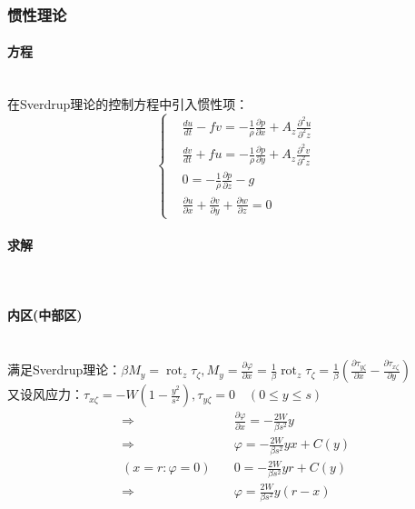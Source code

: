 \documentclass[a4paper,12pt]{article}
\begin{document}
    \subsubsection{惯性理论}
    \paragraph{方程}~{}\\
    在Sverdrup理论的控制方程中引入惯性项：
    \[
        \left\{
            \begin{aligned}
                &\frac{du}{dt}-f v=-\frac{1}{\rho} \frac{\partial p}{\partial x}+A_{z} \frac{\partial^{2} u}{\partial^{2} z} \\
                &\frac{dv}{dt}+fu=-\frac{1}{\rho} \frac{\partial p}{\partial y}+A_{z} \frac{\partial^{2} v}{\partial^{2} z} \\
                &0=-\frac{1}{\rho} \frac{\partial p}{\partial z}-g\\
                &\frac{\partial u}{\partial x}+\frac{\partial v}{\partial y}+\frac{\partial w}{\partial z}=0
            \end{aligned}
        \right.
    \]
    \paragraph{求解}~{}
    \paragraph{内区(中部区)}~{}\\
    满足Sverdrup理论：$\displaystyle \beta M_y=\operatorname{rot}_z\tau_\zeta,M_y=\frac{\partial \varphi}{\partial x}=\frac{1}{\beta} \operatorname{rot}_{z} \tau_{\zeta}=\frac{1}{\beta}\left(\frac{\partial \tau_{y\zeta}}{\partial x}-\frac{\partial \tau_{x\zeta}}{\partial y}\right)$\\
    又设风应力：$\displaystyle \tau_{x\zeta}=-W\left(1-\frac{y^2}{s^2}\right),\tau_{y\zeta}=0\quad (0\leq y \leq s)$\\
    \[
        \begin{aligned}
            \Rightarrow &\frac{\partial \varphi}{\partial x}=-\frac{2W}{\beta s^2}y\\
            \Rightarrow &\varphi=-\frac{2W}{\beta s^2}yx+C(y)\\
            (x=r:\varphi=0)\quad &0=-\frac{2W}{\beta s^2}yr+C(y)\\
            \Rightarrow &\varphi=\frac{2W}{\beta s^2}y(r-x)
        \end{aligned}
    \]
\end{document}
